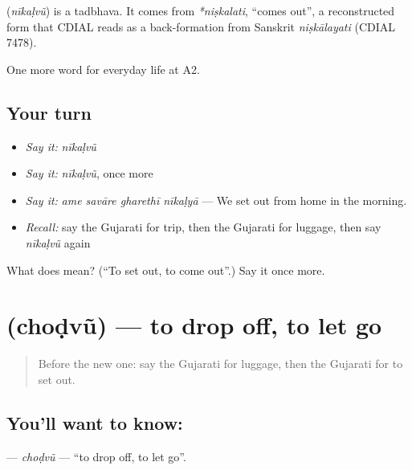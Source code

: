 \begin{cousinweb}
\textbf{} (\emph{nīkaḷvũ}) is a tadbhava. It comes from \emph{*niṣkalati}, \textquotedblleft{}comes out\textquotedblright{}, a reconstructed form that CDIAL reads as a back-formation from Sanskrit \emph{niṣkālayati} (CDIAL 7478).
\end{cousinweb}

\begin{grammarlens}[title={What you've built}]
One more word for everyday life at A2.
\end{grammarlens}

\subsection*{Your turn}
\begin{itemize}
\raggedright
  \item \emph{Say it:} \emph{nīkaḷvũ}
  \item \emph{Say it:} \emph{nīkaḷvũ}, once more
  \item \emph{Say it:} \emph{ame savāre gharethī nīkaḷyā} — We set out from home in the morning.
  \item \emph{Recall:} say the Gujarati for trip, then the Gujarati for luggage, then say \emph{nīkaḷvũ} again
\end{itemize}

\begin{tcolorbox}[breakable,colback=teal!4,colframe=teal!35!black,title={Before you move on}]
What does  mean? (\textquotedblleft{}To set out, to come out\textquotedblright{}.) Say it once more.
\end{tcolorbox}
\section[\texorpdfstring{\gu{છોડવું} (choḍvũ)}{છોડવું (choḍvũ)}]{ (choḍvũ) — to drop off, to let go}

\label{lesson:GU-C203-chodvu}



\begin{quote}
Before the new one: say the Gujarati for luggage, then the Gujarati for to set out.
\end{quote}

\subsection*{You'll want to know: }
\textbf{} — \emph{choḍvũ} — \textquotedblleft{}to drop off, to let go\textquotedblright{}.

